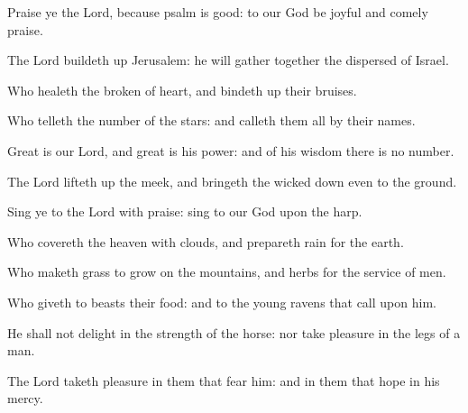 ﻿\item Praise ye the Lord, because psalm is good: to our God be joyful and comely praise.
\item The Lord buildeth up Jerusalem: he will gather together the dispersed of Israel.
\item Who healeth the broken of heart, and bindeth up their bruises.
\item Who telleth the number of the stars: and calleth them all by their names.
\item Great is our Lord, and great is his power: and of his wisdom there is no number.
\item The Lord lifteth up the meek, and bringeth the wicked down even to the ground.
\item Sing ye to the Lord with praise: sing to our God upon the harp.
\item Who covereth the heaven with clouds, and prepareth rain for the earth.
\item Who maketh grass to grow on the mountains, and herbs for the service of men.
\item Who giveth to beasts their food: and to the young ravens that call upon him.
\item He shall not delight in the strength of the horse: nor take pleasure in the legs of a man.
\item The Lord taketh pleasure in them that fear him: and in them that hope in his mercy.